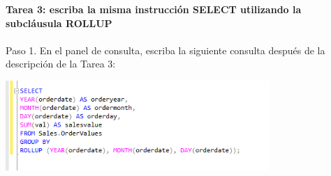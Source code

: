 \begin{flushleft}
\textbf{Tarea 3: escriba la misma instrucción SELECT utilizando la subcláusula ROLLUP}
\textbf{}\\
\textbf{}\\
Paso 1. En el panel de consulta, escriba la siguiente consulta después de la descripción de la Tarea 3:
\begin{center}
	\includegraphics[width=10cm]{./Imagenes/6img5} 
	\end{center}
\textbf{}\\



\end{flushleft}
